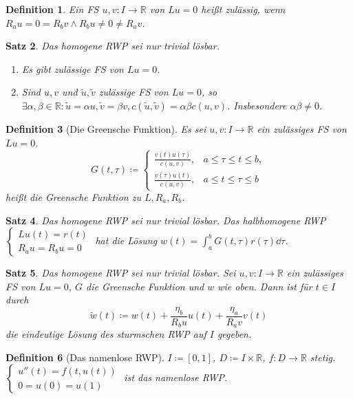 \documentclass[a4paper]{article}
\newcounter{Sec}
\theoremstyle{marginbreak}
\newtheorem{definition}{Definition}[Sec]
\newtheorem{satz}[definition]{Satz}
\newcommand{\R}{\mathbb{R}}
\begin{document}
	\begin{definition}
		Ein FS $u, v\colon I\to\R$ von $Lu=0$ heißt zulässig, wenn $R_au=0=R_bv\wedge R_bu\neq 0\neq R_av$.
	\end{definition}
	\begin{satz}
		Das homogene RWP sei nur trivial lösbar.
		\begin{enumerate}[label=(\alph*)]
			\item Es gibt zulässige FS von $Lu=0$.
			\item Sind $u, v$ und $\tilde{u},\tilde{v}$ zulässige FS von $Lu=0$, so
				$\exists\alpha,\beta\in\R:\tilde{u}=\alpha u, \tilde{v}=\beta v,
				c(\tilde{u},\tilde{v})=\alpha\beta c(u, v)$. Insbesondere $\alpha\beta\neq 0$.
		\end{enumerate}
	\end{satz}
	\begin{definition}[Die Greensche Funktion]
		Es sei $u, v\colon I\to\R$ ein zulässiges FS von $Lu=0$.
		\[G(t,\tau)\coloneqq\begin{cases}\frac{v(t)u(\tau)}{c(u, v)}, &a\leq\tau\leq t\leq b,\\
			\frac{v(\tau)u(t)}{c(u, v)}, &a\leq t\leq\tau\leq b\end{cases}
		\]
		heißt die Greensche Funktion zu $L, R_a, R_b$.
	\end{definition}
	\begin{satz}
		Das homogene RWP sei nur trivial lösbar.
		Das halbhomogene RWP $\begin{cases}Lu(t)=r(t)\\R_au=R_bu=0\end{cases}$ hat die Lösung
		$w(t)=\int_a^b G(t,\tau)r(\tau)\dd{\tau}$.
	\end{satz}
	\begin{satz}
		Das homogene RWP sei nur trivial lösbar. Sei $u, v\colon I\to\R$ ein zulässiges FS
		von $Lu=0$, $G$ die Greensche Funktion und $w$ wie oben. Dann ist für $t\in I$ durch
		\[
			\tilde{w}(t)\coloneqq w(t)+\frac{\eta_b}{R_bu}u(t)+\frac{\eta_a}{R_av}v(t)
		\]
		die eindeutige Lösung des sturmschen RWP auf $I$ gegeben.
	\end{satz}
	\begin{definition}[Das namenlose RWP]
		$I\coloneqq [0, 1]$, $D\coloneqq I\times\R$, $f\colon D\to\R$ stetig.
		$\begin{cases}u''(t)=f(t,u(t))\\0=u(0)=u(1)\end{cases}$ ist das namenlose RWP.
	\end{definition}
\end{document}
